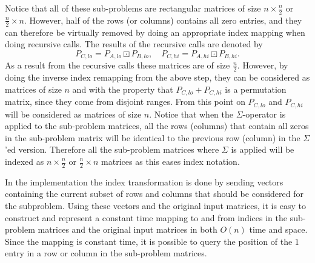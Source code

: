 \documentclass[twoside,11pt,openright]{report}
\begin{document}
Notice that all of these sub-problems are rectangular matrices of size $n \times \frac{n}{2}$ or $\frac{n}{2} \times n$. However, half of the rows (or columns) contains all zero entries, and they can therefore be virtually removed by doing an appropriate index mapping when doing recursive calls. The results of the recursive calls are denoted by
\[
  P_{C,lo} = P_{A,lo} \boxdot P_{B,lo}, \quad P_{C,hi} = P_{A,hi} \boxdot P_{B,hi}.
\]
As a result from the recursive calls these matrices are of size $\frac{n}{2}$. However, by doing the inverse index remapping from the above step, they can be considered as matrices of size $n$ and with the property that $P_{C,lo} + P_{C,hi}$ is a permutation matrix, since they come from disjoint ranges. From this point on $P_{C,lo}$ and $P_{C,hi}$ will be considered as matrices of size $n$. Notice that when the $\Sigma$-operator is applied to the sub-problem matrices, all the rows (columns) that contain all zeros in the sub-problem matrix will be identical to the previous row (column) in the $\Sigma$'ed version. Therefore all the sub-problem matrices where $\Sigma$ is applied will be indexed as $n \times \frac{n}{2}$ or $\frac{n}{2} \times n$ matrices as this eases index notation.

In the implementation the index transformation is done by sending vectors containing the current subset of rows and columns that should be considered for the subproblem. Using these vectors and the original input matrices, it is easy to construct and represent a constant time mapping to and from indices in the sub-problem matrices and the original input matrices in both $O(n)$ time and space. Since the mapping is constant time, it is possible to query the position of the $1$ entry in a row or column in the sub-problem matrices.
\end{document}
